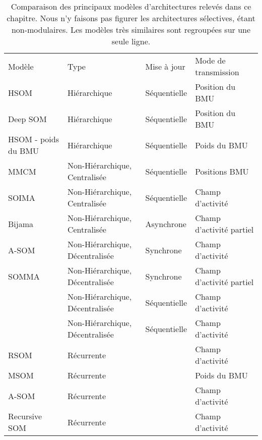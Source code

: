 \documentclass[../main]{subfiles}
\begin{document}
{\begin{table}[t!]
    \renewcommand{\arraystretch}{1.5}
    \caption{Comparaison des principaux modèles d'architectures relevés dans ce chapitre. Nous n'y faisons pas figurer les architectures sélectives, étant non-modulaires. Les modèles très similaires sont regroupées sur une seule ligne. \label{tab:bib}}
    \vspace{5mm}
    \begin{threeparttable}
    \begin{tabular}{p{2cm}p{6cm}p{2cm}p{5cm}}
        Modèle& Type& Mise à jour& Mode de transmission    \\
        HSOM\tnote{1}& Hiérarchique & Séquentielle & Position du BMU  \\
        Deep SOM\tnote{2} & Hiérarchique & Séquentielle & Position du BMU   \\
        HSOM - poids du BMU\tnote{3} & Hiérarchique & Séquentielle & Poids du BMU \\
        \hline
        MMCM \tnote{4} & Non-Hiérarchique, Centralisée & Séquentielle    & Positions BMU    \\                  
        SOIMA\tnote{5} & Non-Hiérarchique, Centralisée & Séquentielle    & Champ d'activité \\
        Bijama\tnote{6} & Non-Hiérarchique, Centralisée&   Asynchrone    & Champ d'activité partiel \\ 
        A-SOM  \tnote{7} & Non-Hiérarchique, Décentralisée       & Synchrone       & Champ d'activité \\
        SOMMA  \tnote{8}          & Non-Hiérarchique, Décentralisée       & Synchrone       & Champ d'activité partiel \\
        \cite{jayaratne_bio-inspired_2018}           & Non-Hiérarchique, Décentralisée       & Séquentielle    & Champ d'activité \\
        \cite{khacef_brain-inspired_2020}            & Non-Hiérarchique, Décentralisée       & Séquentielle    & Champ d'activité \\
        \hline
        RSOM  \tnote{9}      & Récurrente                            &                & Champ d'activité \\
        MSOM   \tnote{10}& Récurrente                                   &                & Poids du BMU\\
        A-SOM   \tnote{11}& Récurrente                            &                & Champ d'activité\\
        Recursive SOM \tnote{12}& Récurrente                            &                & Champ d'activité\\

\end{tabular}
\end{threeparttable}
\end{table}}
\end{document}
